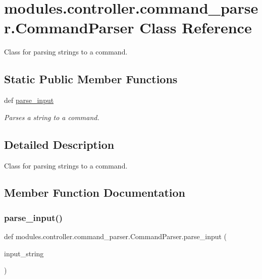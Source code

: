 \hypertarget{classmodules_1_1controller_1_1command__parser_1_1_command_parser}{}\section{modules.\+controller.\+command\+\_\+parser.\+Command\+Parser Class Reference}
\label{classmodules_1_1controller_1_1command__parser_1_1_command_parser}


Class for parsing strings to a command.  


\subsection*{Static Public Member Functions}
\begin{DoxyCompactItemize}
\item 
def \mbox{\hyperlink{classmodules_1_1controller_1_1command__parser_1_1_command_parser_a63730578bba4d76d66b0b86b8bda6974}{parse\+\_\+input}}
\begin{DoxyCompactList}\small\item\em Parses a string to a command. \end{DoxyCompactList}\end{DoxyCompactItemize}


\subsection{Detailed Description}
Class for parsing strings to a command. 

\subsection{Member Function Documentation}
\mbox{\label{classmodules_1_1controller_1_1command__parser_1_1_command_parser_a63730578bba4d76d66b0b86b8bda6974}} 
\subsubsection{\texorpdfstring{parse\+\_\+input()}{parse\_input()}}
{\footnotesize\ttfamily def modules.\+controller.\+command\+\_\+parser.\+Command\+Parser.\+parse\+\_\+input (\begin{DoxyParamCaption}\item[{}]{input\+\_\+string }\end{DoxyParamCaption})\hspace{0.3cm}{\ttfamily [static]}}



